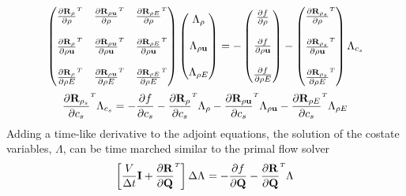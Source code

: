 \begin{equation}
  \begin{pmatrix}
    \rtdiff{\rho}{\rho}     & \rtdiff{\rho \vu}{\rho}     & \rtdiff{\rho E}{\rho} \\ \\
    \rtdiff{\rho}{\rho \vu} & \rtdiff{\rho \vu}{\rho \vu} & \rtdiff{\rho E}{\rho \vu} \\ \\
    \rtdiff{\rho}{\rho E}   & \rtdiff{\rho \vu}{\rho E}   & \rtdiff{\rho E}{\rho E}
  \end{pmatrix}
  \begin{pmatrix}
    \adjlam{\rho} \\ \\
    \adjlam{\rho \vu} \\ \\
    \adjlam{\rho E}
  \end{pmatrix}
  = -
  \begin{pmatrix}
    \pd{f}{\rho} \\ \\
    \pd{f}{\rho \vu} \\ \\
    \pd{f}{\rho E}
  \end{pmatrix}
  -
  \begin{pmatrix}
    \rtdiff{\rho_s}{\rho} \\ \\
    \rtdiff{\rho_s}{\rho \vu} \\ \\
    \rtdiff{\rho_s}{\rho E}
  \end{pmatrix}
  \adjlam{c_s}
  \label{dc-adjoint-1}
\end{equation}
\begin{equation}
  \rtdiff{\rho_s}{c_s}
  \adjlam{c_s}
  = -\pd{f}{c_s}
  - \rtdiff{\rho}{c_s} \adjlam{\rho}
  - \rtdiff{\rho \vu}{c_s} \adjlam{\rho \vu}
  - \rtdiff{\rho E}{c_s} \adjlam{\rho E}
  \label{dc-adjoint-2}
\end{equation}
Adding a time-like derivative to the adjoint equations, the solution of the
costate variables, $\Lambda$, can be time marched similar to the primal flow
solver
\begin{equation}
  \left[ \frac{V}{\Delta t} \mi + \rtdiff{}{\mq} \right] \Delta
  \adjlam{}
  = -\pd{f}{\mq} - \rtdiff{}{\mq} \adjlam{}
  \label{adj-dc-time-general}
\end{equation}

